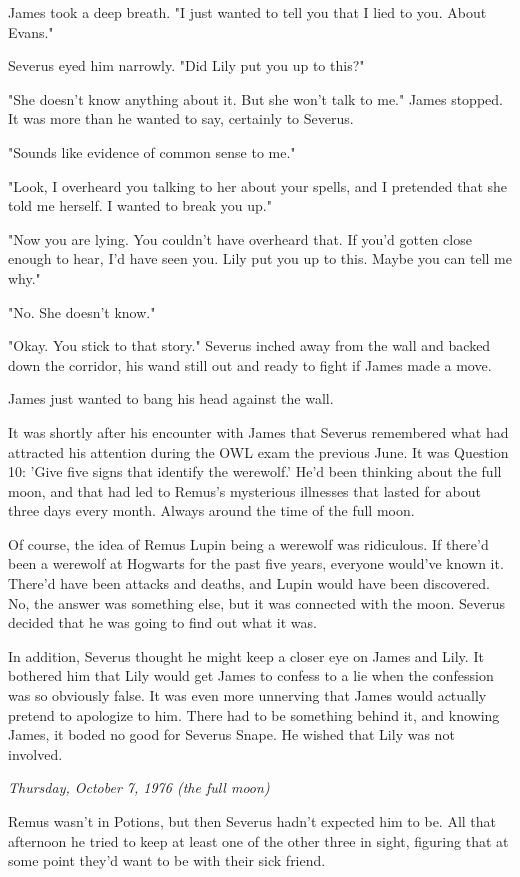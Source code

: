 \documentclass[a4paper,11pt]{article}
\begin{document}
James took a deep breath. "I just wanted to tell you that I lied to you. About Evans."

Severus eyed him narrowly. "Did Lily put you up to this?"

"She doesn't know anything about it. But she won't talk to me." James stopped. It was more than he wanted to say, certainly to Severus.

"Sounds like evidence of common sense to me."

"Look, I overheard you talking to her about your spells, and I pretended that she told me herself. I wanted to break you up."

"Now you are lying. You couldn't have overheard that. If you'd gotten close enough to hear, I'd have seen you. Lily put you up to this. Maybe you can tell me why."

"No. She doesn't know."

"Okay. You stick to that story." Severus inched away from the wall and backed down the corridor, his wand still out and ready to fight if James made a move.

James just wanted to bang his head against the wall.

It was shortly after his encounter with James that Severus remembered what had attracted his attention during the OWL exam the previous June. It was Question 10: 'Give five signs that identify the werewolf.' He'd been thinking about the full moon, and that had led to Remus's mysterious illnesses that lasted for about three days every month. Always around the time of the full moon.

Of course, the idea of Remus Lupin being a werewolf was ridiculous. If there'd been a werewolf at Hogwarts for the past five years, everyone would've known it. There'd have been attacks and deaths, and Lupin would have been discovered. No, the answer was something else, but it was connected with the moon. Severus decided that he was going to find out what it was.

In addition, Severus thought he might keep a closer eye on James and Lily. It bothered him that Lily would get James to confess to a lie when the confession was so obviously false. It was even more unnerving that James would actually pretend to apologize to him. There had to be something behind it, and knowing James, it boded no good for Severus Snape. He wished that Lily was not involved.

\emph{Thursday, October 7, 1976 (the full moon)}

Remus wasn't in Potions, but then Severus hadn't expected him to be. All that afternoon he tried to keep at least one of the other three in sight, figuring that at some point they'd want to be with their sick friend.
\end{document}
